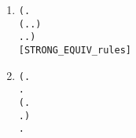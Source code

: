 \begin{enumerate}
\item \begin{alltt}
\HOLTokenTurnstile{} (\HOLSymConst{\HOLTokenForall{}}.
        (\HOLSymConst{\HOLTokenForall{}}.  \HOLTokenTransBegin{}\HOLTokenTransEnd {} \HOLSymConst{\HOLTokenImp{}} \HOLSymConst{\HOLTokenExists{}}.  \HOLTokenTransBegin{}\HOLTokenTransEnd {} \HOLSymConst{\HOLTokenConj{}}  \HOLSymConst{\HOLTokenStrongEQ} ) \HOLSymConst{\HOLTokenConj{}}
        \HOLSymConst{\HOLTokenForall{}}.  \HOLTokenTransBegin{}\HOLTokenTransEnd {} \HOLSymConst{\HOLTokenImp{}} \HOLSymConst{\HOLTokenExists{}}.  \HOLTokenTransBegin{}\HOLTokenTransEnd {} \HOLSymConst{\HOLTokenConj{}}  \HOLSymConst{\HOLTokenStrongEQ} ) \HOLSymConst{\HOLTokenImp{}}
    \HOLSymConst{\HOLTokenStrongEQ} \hfill{[STRONG_EQUIV_rules]}
\end{alltt}
\item \begin{alltt}
\HOLTokenTurnstile{} (\HOLSymConst{\HOLTokenForall{}} .
           \HOLSymConst{\HOLTokenImp{}}
        \HOLSymConst{\HOLTokenForall{}}.
            (\HOLSymConst{\HOLTokenForall{}}.
                  \HOLTokenTransBegin{}\HOLTokenTransEnd {} \HOLSymConst{\HOLTokenImp{}}
                 \HOLSymConst{\HOLTokenExists{}}.  \HOLTokenTransBegin{}\HOLTokenTransEnd {} \HOLSymConst{\HOLTokenConj{}}   ) \HOLSymConst{\HOLTokenConj{}}
            \HOLSymConst{\HOLTokenForall{}}.
                 \HOLTokenTransBegin{}\HOLTokenTransEnd {} \HOLSymConst{\HOLTokenImp{}}

\end{alltt}
\end{enumerate}
